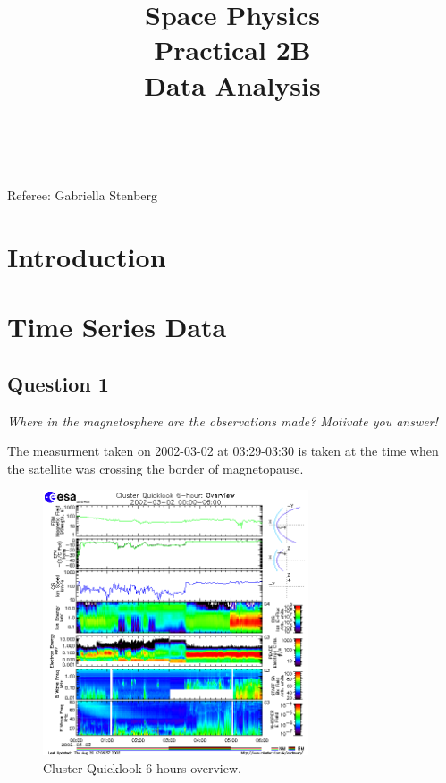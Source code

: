 \documentclass{article}
\title{\textbf {Space Physics} \\ Practical 2B\\ Data Analysis} %
\author{\authorivan\\\authoranu}
\begin{document}
\maketitle %

\centerline{Referee: Gabriella Stenberg}

\setlength\parindent{0pt} %

\renewcommand{\labelenumi}{\alph{enumi}} %
\clearpage

\tableofcontents

\listoffigures

\clearpage

\section{Introduction}

    

\section{Time Series Data}

\subsection{Question 1}
\textit{Where in the magnetosphere are the observations made? Motivate you
answer!}

The measurment taken on 2002-03-02 at 03:29-03:30 is taken at the time when the satellite was crossing the border of magnetopause.

\begin{figure}[htb]
\centering
\includegraphics[width=0.7\textwidth]{Figures/cluster.png}
\caption{Cluster Quicklook 6-hours overview.}
\label{fig:cluster}
\end{figure}
\end{document}
